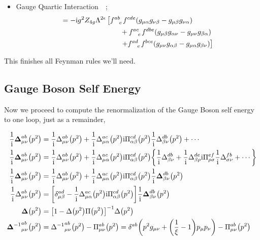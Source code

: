 \begin{itemize}
    \item Gauge Quartic Interaction\ \ ; \begin{align}=-\im g^2Z_{4g}\Lambda^{2\epsilon}&\left[\tensor{f}{^a^b_e}\tensor{f}{^c^d^e}\qty(g_{\mu\alpha}g_{\nu\beta}-g_{\mu\beta}g_{\nu\alpha})\right.\nonumber\\
     &\quad\quad+\tensor{f}{^a^c_e}\tensor{f}{^d^b^e}\qty(g_{\mu\beta}g_{\alpha\nu}-g_{\mu\nu}g_{\beta\alpha})\nonumber\\
     &\quad\quad\left.+\tensor{f}{^a^d_e}\tensor{f}{^b^c^e}\qty(g_{\mu\nu}g_{\alpha\beta}-g_{\mu\alpha}g_{\beta\nu})\right]\end{align}
\end{itemize}

This finishes all Feynman rules we'll need.

\subsection{Gauge Boson Self Energy}

Now we proceed to compute the renormalization of the Gauge Boson self energy to one loop, just as a remainder,

\begin{align}
    \frac1{\textnormal{i}}\boldsymbol\Delta^{ab}_{\mu\nu}\qty(p^2)&=\frac1{\textnormal{i}}\Delta^{ab}_{\mu\nu}\qty(p^2)+\frac1{\textnormal{i}}\Delta^{ac}_{\mu\alpha}\qty(p^2)\textnormal{i}\Pi^{cd}_{\alpha\beta}\qty(p^2)\frac1{\textnormal{i}}\Delta^{db}_{\beta\nu}\qty(p^2)+\cdots\nonumber\\
    \frac1{\textnormal{i}}\boldsymbol\Delta^{ab}_{\mu\nu}\qty(p^2)&=\frac1{\textnormal{i}}\Delta^{ab}_{\mu\nu}\qty(p^2)+\frac1{\textnormal{i}}\Delta^{ac}_{\mu\alpha}\qty(p^2)\textnormal{i}\Pi^{cd}_{\alpha\beta}\qty(p^2)\qty{\frac1{\textnormal{i}}\Delta^{db}_{\beta\nu}+\frac1{\textnormal{i}}\Delta^{de}_{\beta\rho}\textnormal{i}\Pi^{ef}_{\rho\sigma}\frac1{\textnormal{i}}\Delta^{fb}_{\sigma\nu}+\cdots}\nonumber\\
    \frac1{\textnormal{i}}\boldsymbol\Delta^{ab}_{\mu\nu}\qty(p^2)&=\frac1{\textnormal{i}}\Delta^{ab}_{\mu\nu}\qty(p^2)+\frac1{\textnormal{i}}\Delta^{ac}_{\mu\alpha}\qty(p^2)\textnormal{i}\Pi^{cd}_{\alpha\beta}\qty(p^2)\frac1{\textnormal{i}}\boldsymbol\Delta^{db}_{\beta\nu}\qty(p^2)\nonumber\\
    \frac1{\textnormal{i}}\Delta^{ab}_{\mu\nu}\qty(p^2)&=\qty[\delta^{ad}_{\mu\beta}-\frac1{\textnormal{i}}\Delta^{ac}_{\mu\alpha}\qty(p^2)\textnormal{i}\Pi^{cd}_{\alpha\beta}\qty(p^2)]\frac1{\textnormal{i}}\boldsymbol\Delta^{db}_{\beta\nu}\qty(p^2)\nonumber\\
    \boldsymbol\Delta\qty(p^2)&=\qty[1-\Delta\qty(p^2)\Pi\qty(p^2)]^{-1}\Delta\qty(p^2)\nonumber\\
    {\boldsymbol\Delta^{-1}}^{ab}_{\mu\nu}\qty(p^2)&={\Delta^{-1}}^{ab}_{\mu\nu}\qty(p^2)-\Pi^{ab}_{\mu\nu}\qty(p^2)=\delta^{ab}\qty(p^2g_{\mu\nu}+\qty(\frac1\xi-1)p_\mu p_\nu)-\Pi^{ab}_{\mu\nu}\qty(p^2)
\end{align}

